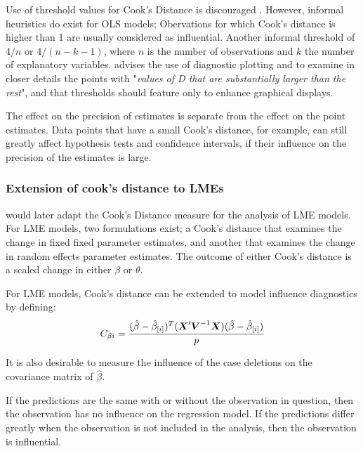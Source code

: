 \documentclass[12pt, a4paper]{report}
\theoremstyle{plain}
\theoremstyle{definition}
\theoremstyle{remark}
\begin{document}
	
	
	Use of threshold values for Cook's Distance is discouraged \citep{fox1997}. However, informal heuristics do exist for OLS models; Obervations for which Cook's distance is higher than 1 are usually considered as influential. Another informal threshold of $4/n$ or $4/(n-k-1)$, where $n$ is the number of observations and $k$ the number of explanatory variables.
\citet{fox1997} advises the use of diagnostic plotting and to examine in closer details the points with "\textit{values of D that are substantially larger than the rest}", and that thresholds should feature only to enhance graphical displays.
	
	
	The effect on the precision of estimates is separate from the effect on the point estimates. Data points that have a small Cook's distance, for example, can still greatly affect hypothesis tests and confidence intervals, if their  influence on the precision of the estimates is large.
	
	

	
\subsubsection{Extension of cook's distance to LMEs}
\citet{Christensen} would later adapt the Cook's Distance measure for the analysis of LME models. For LME models, two formulations exist; a Cook's distance that examines the change in fixed fixed parameter estimates, and another that examines the change in random effects parameter estimates. The outcome of either Cook's distance is a scaled change in either $\beta$ or $\theta$.

For LME models, Cook's distance can be extended to model influence diagnostics by defining:
\[ C_{\beta i} = {(\hat{\beta} - \hat{\beta}_{[i]})^{T}(\boldsymbol{X}^{\prime}\boldsymbol{V}^{-1}\boldsymbol{X}) (\hat{\beta} - \hat{\beta}_{[i]}) \over p}\]

It is also desirable to measure the influence of the case deletions on the covariance matrix of $\hat{\beta}$.

	

If the predictions are the same with or without the observation in question, then the observation has no influence on the regression model. If the predictions differ greatly when the observation is not included in the analysis, then the observation is influential.
\end{document}

